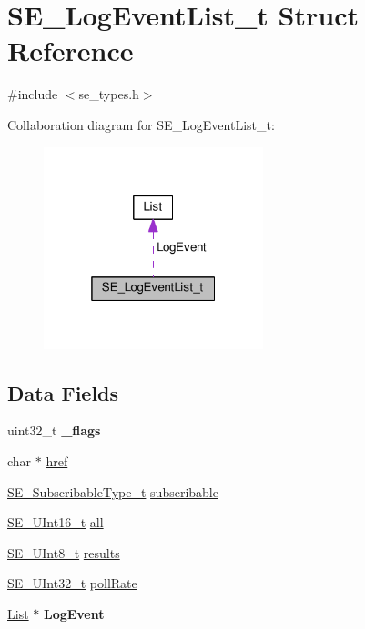 \hypertarget{structSE__LogEventList__t}{}\section{S\+E\+\_\+\+Log\+Event\+List\+\_\+t Struct Reference}
\label{structSE__LogEventList__t}


{\ttfamily \#include $<$se\+\_\+types.\+h$>$}



Collaboration diagram for S\+E\+\_\+\+Log\+Event\+List\+\_\+t\+:\nopagebreak
\begin{figure}[H]
\begin{center}
\leavevmode
\includegraphics[width=181pt]{structSE__LogEventList__t__coll__graph}
\end{center}
\end{figure}
\subsection*{Data Fields}
\begin{DoxyCompactItemize}
\item 
uint32\+\_\+t {\bfseries \+\_\+flags}
\item 
char $\ast$ \hyperlink{group__LogEventList_ga2adcec0539539616990cb3ab699bc9e0}{href}
\item 
\hyperlink{group__SubscribableType_ga5c41f553d369710ed34619266bf2551e}{S\+E\+\_\+\+Subscribable\+Type\+\_\+t} \hyperlink{group__LogEventList_ga56149eb351e449cbb2722991e2daa1bc}{subscribable}
\item 
\hyperlink{group__UInt16_gac68d541f189538bfd30cfaa712d20d29}{S\+E\+\_\+\+U\+Int16\+\_\+t} \hyperlink{group__LogEventList_gac1fb1159b6c4504d77ae255eb3d36e17}{all}
\item 
\hyperlink{group__UInt8_gaf7c365a1acfe204e3a67c16ed44572f5}{S\+E\+\_\+\+U\+Int8\+\_\+t} \hyperlink{group__LogEventList_ga6cfbe323819724f04cdb2a6ee4300628}{results}
\item 
\hyperlink{group__UInt32_ga70bd4ecda3c0c85d20779d685a270cdb}{S\+E\+\_\+\+U\+Int32\+\_\+t} \hyperlink{group__LogEventList_ga388cf556e1a06ced33e78bbac0c0ab88}{poll\+Rate}
\item 
\hyperlink{structList}{List} $\ast$ {\bfseries Log\+Event}
\end{DoxyCompactItemize}


